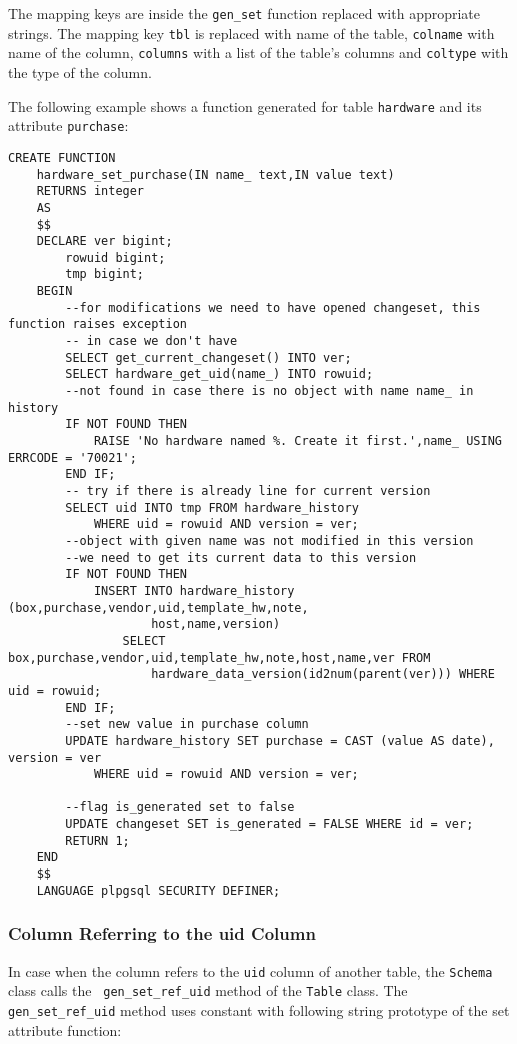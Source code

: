 \documentclass[deska]{subfiles}
\begin{document}
The mapping keys are inside the {\tt gen\_set} function replaced with appropriate strings. The mapping key {\tt tbl} is
replaced with name of the table, {\tt colname} with name of the column, {\tt columns} with a list of the table's columns
and {\tt coltype} with the type of the column.

The following example shows a function generated for table {\tt hardware} and its attribute {\tt purchase}:

\begin{verbatim}
CREATE FUNCTION
    hardware_set_purchase(IN name_ text,IN value text)
    RETURNS integer
    AS
    $$
    DECLARE ver bigint;
        rowuid bigint;
        tmp bigint;
    BEGIN
        --for modifications we need to have opened changeset, this function raises exception
        -- in case we don't have
        SELECT get_current_changeset() INTO ver;
        SELECT hardware_get_uid(name_) INTO rowuid;
        --not found in case there is no object with name name_ in history
        IF NOT FOUND THEN
            RAISE 'No hardware named %. Create it first.',name_ USING ERRCODE = '70021';
        END IF;
        -- try if there is already line for current version
        SELECT uid INTO tmp FROM hardware_history
            WHERE uid = rowuid AND version = ver;
        --object with given name was not modified in this version
        --we need to get its current data to this version
        IF NOT FOUND THEN
            INSERT INTO hardware_history (box,purchase,vendor,uid,template_hw,note,
                    host,name,version)
                SELECT box,purchase,vendor,uid,template_hw,note,host,name,ver FROM
                    hardware_data_version(id2num(parent(ver))) WHERE uid = rowuid;
        END IF;
        --set new value in purchase column
        UPDATE hardware_history SET purchase = CAST (value AS date), version = ver
            WHERE uid = rowuid AND version = ver;

        --flag is_generated set to false
        UPDATE changeset SET is_generated = FALSE WHERE id = ver;
        RETURN 1;
    END
    $$
    LANGUAGE plpgsql SECURITY DEFINER;

\end{verbatim}

\subsubsection{Column Referring to the uid Column}

In case when the column refers to the {\tt uid} column of another table, the {\tt Schema} class calls the {\tt
gen\_set\_ref\_uid} method of the {\tt Table} class. The {\tt gen\_set\_ref\_uid} method uses constant with following
string prototype of the set attribute function:
\end{document}

